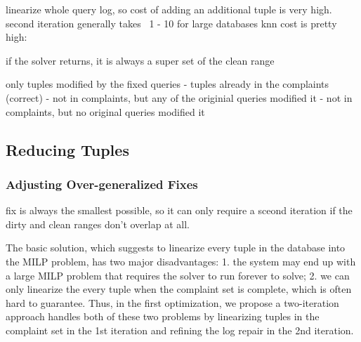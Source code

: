linearize whole query log, so cost of adding an additional tuple is very high.
second iteration generally takes ~1 - 10%
for large databases knn cost is pretty high: ~

if the solver returns, it is always a super set of the clean range

only tuples modified by the fixed queries
- tuples already in the complaints (correct)
- not in complaints, but any of the originial queries modified it
- not in complaints, but no original queries modified it



\subsection{Reducing Tuples}
\label{sec:opt:tbsize}


\subsubsection{Adjusting Over-generalized Fixes}

fix is always the smallest possible, so it can only require a sceond iteration if the dirty and clean
ranges don't overlap at all.  

The basic solution, which suggests to linearize every tuple in the database into the MILP problem,
has two major disadvantages: 1. the system may end up with a large MILP problem that requires 
the solver to run forever to solve; 2. we can only linearize the every tuple
when the complaint set is complete, which is often hard to guarantee. Thus, in the first 
optimization, we propose a two-iteration approach handles both of these two problems 
by linearizing tuples in the complaint set in
the 1st iteration and refining the log repair in the 2nd iteration. \\
